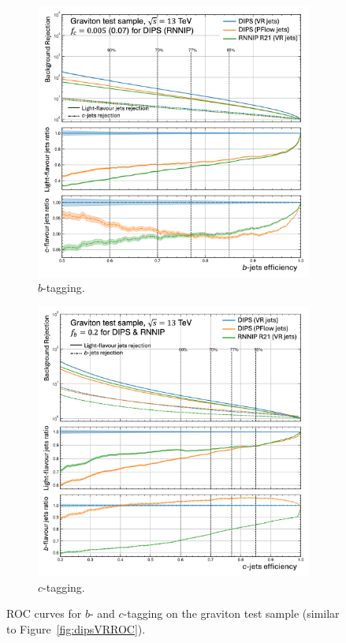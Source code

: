 \begin{figure}[h!]
  \centering
  \begin{subfigure}[t]{0.48\textwidth}
    \centering
    \includegraphics[width=\textwidth]{Images/FTAG/VRDips/ROC/grb.png}
    \caption{$b$-tagging.}
    \label{fig:dipsVRROCgr}
  \end{subfigure}
  \begin{subfigure}[t]{0.48\textwidth}
    \centering
    \includegraphics[width=\textwidth]{Images/FTAG/VRDips/ROC/grc.png}
    \caption{$c$-tagging.}
    \label{fig:dipsVRROCgrc}
  \end{subfigure}
  \caption{ROC curves for $b$- and $c$-tagging on the graviton test sample (similar to Figure~\ref{fig:dipsVRROC}).}
  \label{fig:dipsVRROCgrav}
\end{figure}

